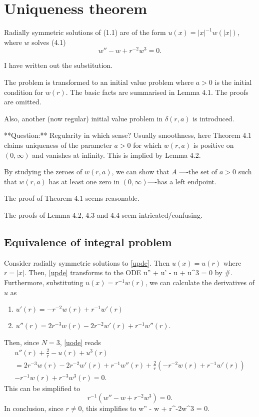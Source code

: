 \section{Uniqueness theorem}
{\new 
Radially symmetric solutions of (1.1) are of the form $u(x)=|x|^{-1}w(|x|)$, where $w$ solves (4.1) $$w''-w+r^{-2}w^3=0.$$

I have written out the substitution.

The problem is transformed to an initial value problem where $a>0$ is the initial condition for $w(r)$. The basic facts are summarised in Lemma 4.1. The proofs are omitted. 

Also, another (now regular) initial value problem in $\delta(r,a)$ is introduced. 

**Question:** Regularity in which sense? Usually smoothness, here 
Theorem 4.1 claims uniqueness of the parameter $a>0$ for which $w(r, a)$ is positive on $(0, \infty)$ and vanishes at infinity. This is implied by Lemma 4.2.

By studying the zeroes of $w(r,a)$, we can show that $A$ ----the set of $a>0$ such that $w(r, a)$ has at least one zero in $(0, \infty)$----has a left endpoint.

The proof of Theorem 4.1 seems reasonable.

The proofs of Lemma 4.2, 4.3 and 4.4 seem intricated/confusing. }
\subsection{Equivalence of integral problem}
Consider radially symmetric solutions to \eqref{upde}. Then $u(x) = u(r)$ where $r=|x|$. Then, \eqref{upde} transforms to the ODE
\be \label{uode} u'' +  u' - u + u^3 = 0 \ee 
by \#. Furthermore, substituting $u(x) = r^{-1}w(r)$, we can calculate the derivatives of $u$ as
\begin{enumerate}
    \item $u'(r) = -r^{-2}w(r) + r^{-1}w'(r)$
    \item $u''(r) = 2r^{-3}w(r) - 2r^{-2}w'(r) + r^{-1}w''(r)$.
\end{enumerate}
Then, since $N=3$, \eqref{uode} reads
\begin{multline} 
u''(r) + \frac{2}{r} - u(r) + u^3(r) \\
= 2r^{-3}w(r) - 2r^{-2}w'(r) + r^{-1}w''(r)
+ \frac{2}{r}\left(-r^{-2}w(r) + r^{-1}w'(r)\right) \\
- r^{-1}w(r) + r^{-3}w^3(r) = 0.
\end{multline}
This can be simplified to
$$ r^{-1}\left(w'' - w + r^{-2}w^3 \right) = 0. $$
In conclusion, since $r\neq 0$, this simplifies to
\be \label{wode} w'' - w + r^{-2}w^3 = 0. \ee

